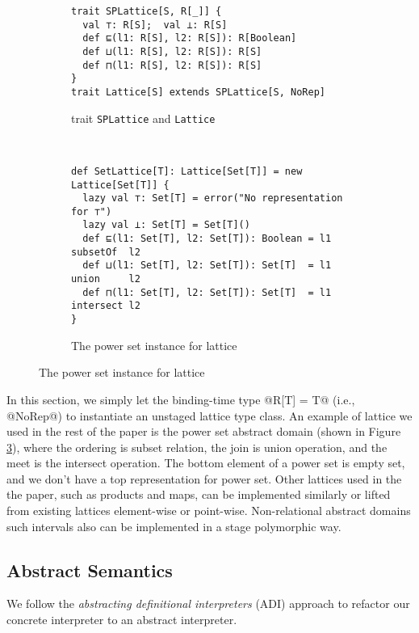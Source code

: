\begin{figure}[h!]
  \centering
  \begin{subfigure}[b]{0.45\textwidth}
  \begin{lstlisting}[style=small]
trait SPLattice[S, R[_]] {
  val ⊤: R[S];  val ⊥: R[S]
  def ⊑(l1: R[S], l2: R[S]): R[Boolean]
  def ⊔(l1: R[S], l2: R[S]): R[S]
  def ⊓(l1: R[S], l2: R[S]): R[S]
}
trait Lattice[S] extends SPLattice[S, NoRep]
  \end{lstlisting}
  \caption{trait \texttt{SPLattice} and \texttt{Lattice}} \label{fig:splattice}
  \end{subfigure}
  ~
  \begin{subfigure}[b]{0.6\textwidth}
\begin{lstlisting}[style=small]
def SetLattice[T]: Lattice[Set[T]] = new Lattice[Set[T]] {
  lazy val ⊤: Set[T] = error("No representation for ⊤")
  lazy val ⊥: Set[T] = Set[T]()
  def ⊑(l1: Set[T], l2: Set[T]): Boolean = l1 subsetOf  l2
  def ⊔(l1: Set[T], l2: Set[T]): Set[T]  = l1 union     l2
  def ⊓(l1: Set[T], l2: Set[T]): Set[T]  = l1 intersect l2
}
\end{lstlisting}
  \caption{The power set instance for lattice} \label{fig:powerset}
\end{subfigure}
\end{figure}

In this section, we simply let the binding-time type @R[T] = T@ (i.e., @NoRep@)
to instantiate an unstaged lattice type class. An example of lattice we used in
the rest of the paper is the power set abstract domain (shown in Figure
\ref{fig:powerset}), where the ordering is subset relation, the join is union
operation, and the meet is the intersect operation. The bottom element of a
power set is empty set, and we don't have a top representation for power set.
Other lattices used in the the paper, such as products and maps, can be
implemented similarly or lifted from existing lattices element-wise or
point-wise. Non-relational abstract domains such intervals also can be
implemented in a stage polymorphic way.

\subsection{Abstract Semantics}

We follow the \textit{abstracting definitional interpreters} (ADI) approach
\cite{DBLP:journals/pacmpl/DaraisLNH17} to refactor our concrete interpreter to
an abstract interpreter.

